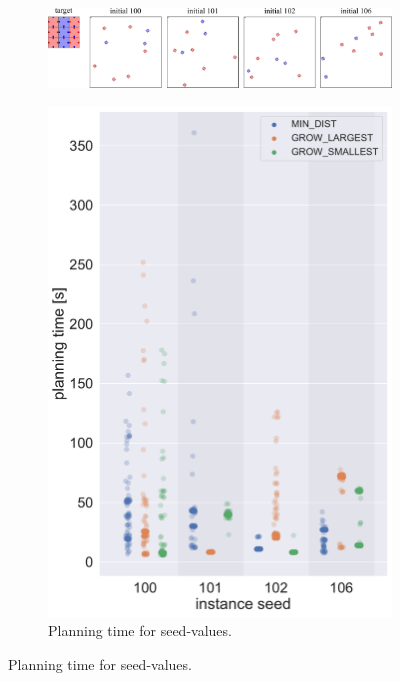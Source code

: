 \begin{figure}
	\centering
	\begin{subfigure}[b]{0.95\textwidth}
		\centering
		\includegraphics[width=\textwidth]{figures/AR_initials.pdf}
	\end{subfigure}%
	\vspace{0.3em}
	\begin{subfigure}[h]{0.5\textwidth}
		\centering
		\includegraphics[width=\textwidth]{figures/plots/AR_time.pdf}
		\caption{Planning time for seed-values.}

\end{subfigure}
\end{figure}
